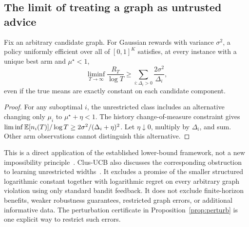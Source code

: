 \subsection{The limit of treating a graph as untrusted advice}
\begin{proposition}
Fix an arbitrary candidate graph. For Gaussian rewards with variance $\sigma^2$, a policy uniformly efficient over all of $[0,1]^K$ satisfies, at every instance with a unique best arm and $\mu^\star<1$,
\begin{equation}
 \liminf_{T\to\infty}\frac{R_T}{\log T}
       \ge\sum_{i:\Delta_i>0}\frac{2\sigma^2}{\Delta_i},
 \label{eq:untrustedlower}
\end{equation}
even if the true means are exactly constant on each candidate component.
\label{prop:untrusted}
\end{proposition}
\begin{proof}
For any suboptimal $i$, the unrestricted class includes an alternative changing only $\mu_i$ to $\mu^\star+\eta<1$. The history change-of-measure constraint gives
$\liminf\mathbb E[n_i(T)]/\log T\ge2\sigma^2/(\Delta_i+\eta)^2$.
Let $\eta\downarrow0$, multiply by $\Delta_i$, and sum. Other arm observations cannot distinguish this alternative.
\end{proof}
This is a direct application of the established lower-bound framework, not a new impossibility principle~\cite{combes2017,lattimore2020}. Clus-UCB also discusses the corresponding obstruction to learning unrestricted widths~\cite{gore2025}. It excludes a promise of the smaller structured logarithmic constant together with logarithmic regret on every arbitrary graph violation using only standard bandit feedback. It does not exclude finite-horizon benefits, weaker robustness guarantees, restricted graph errors, or additional informative data. The perturbation certificate in Proposition~\ref{prop:perturb} is one explicit way to restrict such errors.
